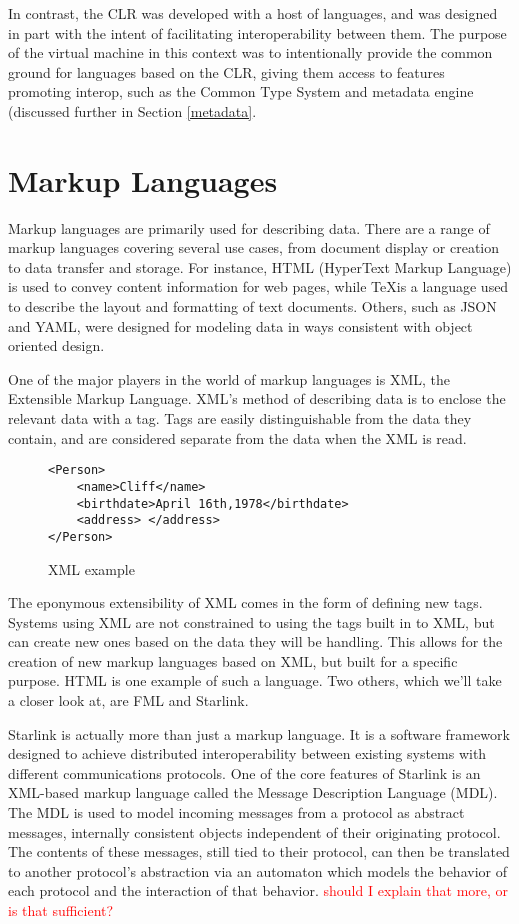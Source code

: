 \documentclass{sig-alternate}
\newcommand{\mycomment}[1]{\textcolor{red}{#1}}
\begin{document}
In contrast, the CLR was developed with a host of languages, and was designed in part with the intent of facilitating interoperability between them. The purpose of the virtual machine in this context was to intentionally provide the common ground for languages based on the CLR, giving them access to features promoting interop, such as the Common Type System and metadata engine (discussed further in Section \ref{metadata}.


\section{Markup Languages}\label{ML}
Markup languages are primarily used for describing data. There are a range of markup languages covering several use cases, from document display or creation to data transfer and storage. For instance, HTML (HyperText Markup Language) is used to convey content information for web pages, while \TeX is a language used to describe the layout and formatting of text documents.
Others, such as JSON and YAML, were designed for modeling data in ways consistent with object oriented design. 

One of the major players in the world of markup languages is XML, the Extensible Markup Language. XML's method of describing data is to enclose the relevant data with a tag. Tags are easily distinguishable from the data they contain, and are considered separate from the data when the XML is read. 


\begin{figure}
\begin{verbatim}
<Person>
	<name>Cliff</name>
	<birthdate>April 16th,1978</birthdate>
	<address> </address>
</Person>
\end{verbatim}
\caption{XML example}
\end{figure}


The eponymous extensibility of XML comes in the form of defining new tags. Systems using XML are not constrained to using the tags built in to XML, but can create new ones based on the data they will be handling. This allows for the creation of new markup languages based on XML, but built for a specific purpose. HTML is one example of such a language. Two others, which we'll take a closer look at, are FML and Starlink.

Starlink \cite{Bromberg:2011} is actually more than just a markup language. It is a software framework designed to achieve distributed interoperability between existing systems with different communications protocols. One of the core features of Starlink is an XML-based markup language called the Message Description Language (MDL). The MDL is used to model incoming messages from a protocol as abstract messages, internally consistent objects independent of their originating protocol. The contents of these messages, still tied to their protocol, can then be translated to another protocol's abstraction via an automaton which models the behavior of each protocol and the interaction of that behavior. \mycomment{should I explain that more, or is that sufficient?}
\end{document}
